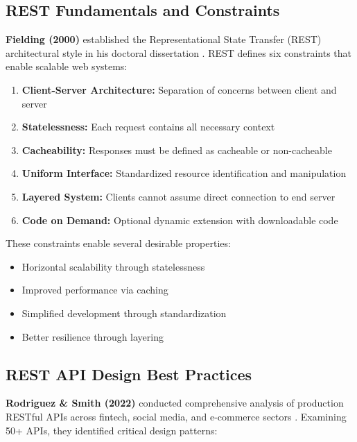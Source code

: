 \documentclass[conference]{IEEEtran}
\begin{document}
\subsection{REST Fundamentals and Constraints}

\textbf{Fielding (2000)} established the Representational State Transfer (REST) architectural style in his doctoral dissertation \cite{fielding2000rest}. REST defines six constraints that enable scalable web systems:

\begin{enumerate}
    \item \textbf{Client-Server Architecture:} Separation of concerns between client and server
    \item \textbf{Statelessness:} Each request contains all necessary context
    \item \textbf{Cacheability:} Responses must be defined as cacheable or non-cacheable
    \item \textbf{Uniform Interface:} Standardized resource identification and manipulation
    \item \textbf{Layered System:} Clients cannot assume direct connection to end server
    \item \textbf{Code on Demand:} Optional dynamic extension with downloadable code
\end{enumerate}

These constraints enable several desirable properties:
\begin{itemize}
    \item Horizontal scalability through statelessness
    \item Improved performance via caching
    \item Simplified development through standardization
    \item Better resilience through layering
\end{itemize}

\subsection{REST API Design Best Practices}

\textbf{Rodriguez \& Smith (2022)} conducted comprehensive analysis of production RESTful APIs across fintech, social media, and e-commerce sectors \cite{rodriguez2022restful}. Examining 50+ APIs, they identified critical design patterns:
\end{document}
